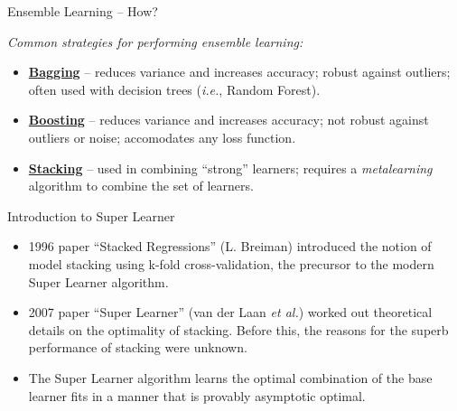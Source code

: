 \documentclass[12pt,t]{beamer}
\begin{document}
\begin{frame}[c]{Ensemble Learning -- How?}

\vspace*{3mm}

\textit{Common strategies for performing ensemble learning:}

\vspace{1em}

\centering

  \begin{itemize}
    \itemsep12pt
    \item \underline{\textbf{Bagging}} -- reduces variance and increases
          accuracy; robust against outliers; often used with decision trees
          (\textit{i.e.}, Random Forest).
    \item \underline{\textbf{Boosting}} -- reduces variance and increases
          accuracy; not robust against outliers or noise; accomodates any loss
          function.
    \item \underline{\textbf{Stacking}} -- used in combining ``strong''
          learners; requires a \textit{metalearning} algorithm to combine the
          set of learners.
  \end{itemize}

\end{frame}


\begin{frame}[c]{Introduction to Super Learner}

\vspace*{3mm}

\centering

  \begin{itemize}
    \itemsep12pt
    \item 1996 paper ``Stacked Regressions'' (L. Breiman) introduced the notion
          of model stacking using k-fold cross-validation, the precursor to the
          modern Super Learner algorithm.
    \item 2007 paper ``Super Learner'' (van der Laan \textit{et al.}) worked out
          theoretical details on the optimality of stacking. Before this, the
          reasons for the superb performance of stacking were unknown.
    \item The Super Learner algorithm learns the optimal combination of the
          base learner fits in a manner that is provably asymptotic optimal.
  \end{itemize}

\end{frame}
\end{document}
